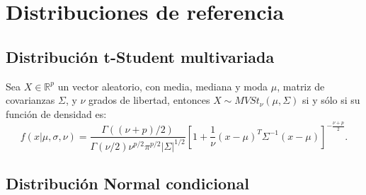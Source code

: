 \chapter[Distribuciones de referencia]{Distribuciones de referencia}\label{chap:Distributions}

\section{Distribuci\'on t-Student multivariada}

\begin{defin*}
    Sea $X \in \mathbb{R}^p$ un vector aleatorio, con media, mediana y moda $\mu$, matriz de covarianzas $\Sigma $, y $\nu$ grados de libertad, entonces $X \sim MVSt_{\nu}(\mu,\Sigma)$ si y s\'olo si su funci\'on de densidad es:
\begin{equation*}
    f(x|\mu,\sigma,\nu) = 
    \frac{\Gamma((\nu+p)/2)}{\Gamma(\nu/2)\nu^{p/2}\pi^{p/2}|\Sigma|^{1/2}}
    \left[1 + \frac{1}{\nu} (x-\mu)^T\Sigma^{-1}(x-\mu)\right]^{-\frac{\nu+p}{2}}.
\end{equation*}
\end{defin*}

\section{Distribuci\'on Normal condicional}


